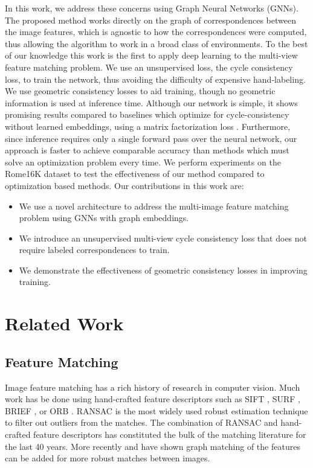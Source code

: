 \documentclass{article} %
\begin{document}
In this work, we address these concerns using Graph Neural Networks (GNNs).
The proposed method works directly on the graph of correspondences between the image features, which is agnostic to how the correspondences were computed, thus allowing the algorithm to work in a broad class of environments.
To the best of our knowledge this work is the first to apply deep learning to the multi-view feature matching problem.
We use an unsupervised loss, the cycle consistency loss, to train the network, thus avoiding the difficulty of expensive hand-labeling.
We use geometric consistency losses to aid training, though no geometric information is used at inference time.
Although our network is simple, it shows promising results compared to baselines which optimize for cycle-consistency without learned embeddings, using a matrix factorization loss \citep{zhou2015multi, leonardos2017distributed}.
Furthermore, since inference requires only a single forward pass over the neural network, our approach is faster to achieve comparable accuracy than methods which must solve an optimization problem every time.
We perform experiments on the Rome16K dataset \citep{li2010location} to test the effectiveness of our method compared to optimization based methods.
Our contributions in this work are:
\begin{itemize}
\item We use a novel architecture to address the multi-image feature matching problem using GNNs with graph embeddings.
\item We introduce an unsupervised multi-view cycle consistency loss that does not require labeled correspondences to train.
\item We demonstrate the effectiveness of geometric consistency losses in improving training.
\end{itemize}


\section{Related Work}

\subsection{Feature Matching}
Image feature matching has a rich history of research in computer vision.
Much work has be done using hand-crafted feature descriptors such as SIFT \citep{lowe2004distinctive}, SURF \citep{bay2006surf}, BRIEF \citep{calonder2012brief}, or ORB \citep{mur2015orb}.
RANSAC \cite{fischler1981random} is the most widely used robust estimation technique to filter out outliers from the matches.
The combination of RANSAC and hand-crafted feature descriptors has constituted the bulk of the matching literature for the last 40 years.
More recently \cite{suh2015subgraph} and \cite{hu2016distributable} have shown graph matching of the features can be added for more robust matches between images.
\end{document}

